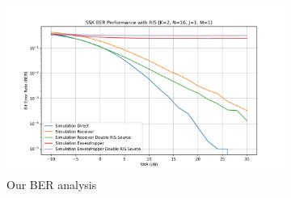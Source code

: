 
\begin{figure}[H]
  \centering
  \begin{subfigure}[b]{0.76\textwidth}
    \centering
    \includegraphics[width=\textwidth]{imgs/ber-simulations/SSK BER Performance with RIS (K=2, N=16, J=1, M=1).png}
    \caption{Our BER analysis}
    \label{fig:simulation_j1_m1}
  \end{subfigure}
  \hfill
  \begin{subfigure}[b]{0.23\textwidth}
    \centering

\end{subfigure}
\end{figure}
